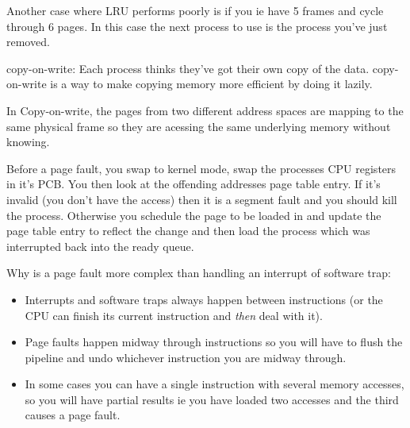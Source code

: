 \documentclass[10pt,\jkfside,a4paper]{article}
\begin{document}
Another case where LRU performs poorly is if you ie have 5 frames and cycle through 6 pages. In 
this case the next process to use is the process you've just removed.

copy-on-write:
Each process thinks they've got their own copy of the data. copy-on-write is a way to 
make copying memory more efficient by doing it lazily.

In Copy-on-write, the pages from two different address spaces are mapping to the same physical 
frame so they are acessing the same underlying memory without knowing.

Before a page fault, you swap to kernel mode, swap the processes CPU registers in it's PCB. You then 
look at the offending addresses page table entry. If it's invalid (you don't have the access) then it is 
a segment fault and you should kill the process. Otherwise you schedule the page to be 
loaded in and update the page table entry to reflect the change and then load the process 
which was interrupted back into the ready queue.

Why is a page fault more complex than handling an interrupt of software trap:

\begin{itemize}

\item Interrupts and software traps always happen between instructions (or the CPU can finish its current 
instruction and \textit{then} deal with it).

\item Page faults happen midway through instructions so you will have to flush the pipeline and 
undo whichever instruction you are midway through.

\item In some cases you can have a single instruction with several memory accesses, so you 
will have partial results ie you have loaded two accesses and the third causes a page fault. 

\end{itemize}
\end{document}

